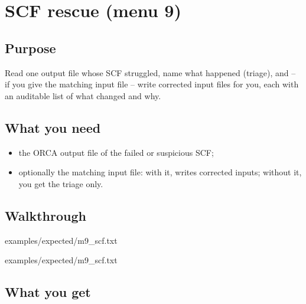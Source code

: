 \chapter{SCF rescue (menu 9)}
\label{ch:menu9}

\section{Purpose}

Read one output file whose SCF struggled, name what happened (triage), and --
if you give the matching input file -- write corrected input files for you,
each with an auditable list of what changed and why.

\section{What you need}

\begin{itemize}
  \item the ORCA output file of the failed or suspicious SCF;
  \item optionally the matching input file: with it,  writes corrected
    inputs; without it, you get the triage only.
\end{itemize}

\section{Walkthrough}


  {examples/expected/m9_scf.txt}


  {examples/expected/m9_scf.txt}

\section{What you get}


